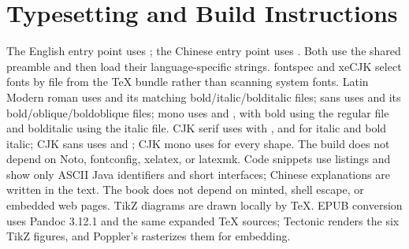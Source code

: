 \section{Typesetting and Build Instructions}
The English entry point uses ; the Chinese entry point uses . Both use the shared preamble and then load their language-specific strings. fontspec and xeCJK select fonts by file from the TeX bundle rather than scanning system fonts. Latin Modern roman uses  and its matching bold/italic/bolditalic files; sans uses  and its bold/oblique/boldoblique files; mono uses  and , with bold using the regular file and bolditalic using the italic file. CJK serif uses  with , and  for italic and bold italic; CJK sans uses  and ; CJK mono uses  for every shape. The build does not depend on Noto, fontconfig, xelatex, or latexmk. Code snippets use listings and show only ASCII Java identifiers and short interfaces; Chinese explanations are written in the text. The book does not depend on minted, shell escape, or embedded web pages. TikZ diagrams are drawn locally by TeX. EPUB conversion uses Pandoc 3.12.1 and the same expanded TeX sources; Tectonic renders the six TikZ figures, and Poppler's  rasterizes them for embedding.

